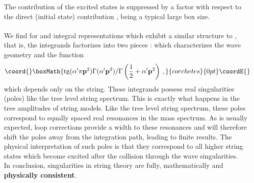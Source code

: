 \documentclass[12pt,a4paper]{article}
\begin{document}
The contribution of the excited states is suppressed by a factor 
\coordHE{} with respect to the direct 
(initial state) contribution \coordHE{}, \coordHE{} being a 
typical large box size. \\ \\  
We find for \coordHE{} and \coordHE{} integral 
representations which exhibit a similar structure to \coordHE{}, 
that is, the integrands factorizes into two pieces  : \coordHE{} 
which characterizes the wave geometry and the function 
\begin{displaymath}\coord{}\boxMath{
\mathrm{tg}(\alpha '\pi {\bf p}^2)\Gamma (\alpha '{\bf p}^2)/\Gamma 
\left( \frac{1}{2} + \alpha '{\bf p}^2 \right) \, ,
}{corchetes}{0pt}\coordE{}\end{displaymath}
which depends only on the string. These integrands possess real singularities 
(poles) like the tree level string spectrum. 
This is exactly what happens in the tree amplitudes of string models. Like the tree level string spectrum, these poles correspond to equally spaced real resonances in the mass 
spectrum. As is usually expected, loop corrections provide a width to these 
resonances and will therefore shift the poles away from the integration path, leading to finite results. The physical interpretation of such poles is that 
they correspond to all higher string states which become excited after the collision through the wave singularities.\\
In conclusion, singularities in string theory are fully, mathematically  and 
{\bf physically consistent}.  
\end{document}
